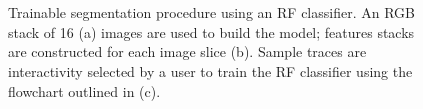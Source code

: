 \begin{figure}[!htbp] \myfloatalign
{}
\\
\\
\caption[Trainable segmentation procedure.]{Trainable segmentation procedure using an \ac{RF} classifier. An \ac{RGB} stack of 16 (a) images are used to build the model; features stacks are constructed for each image slice (b). Sample traces are interactivity selected by a user to train the \ac{RF} classifier using the flowchart outlined in (c).}\label{fig:rf-tws}
\end{figure}

